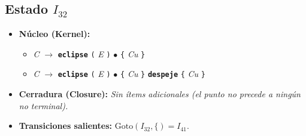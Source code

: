 \documentclass[12pt, letterpaper]{article}
\begin{document}
\subsection*{Estado $I_{32}$ }
\begin{itemize}\setlength{\itemsep}{1pt}\setlength{\parskip}{0pt}
\item \textbf{Núcleo (Kernel):}
\begin{itemize}\setlength{\itemsep}{1pt}\setlength{\parskip}{0pt}
    \item \textit{C} $\to$ \textbf{\texttt{eclipse}} \texttt{(} \textit{E} \texttt{)} $\bullet$ \texttt{\{} \textit{Cu} \texttt{\}}
    \item \textit{C} $\to$ \textbf{\texttt{eclipse}} \texttt{(} \textit{E} \texttt{)} $\bullet$ \texttt{\{} \textit{Cu} \texttt{\}} \textbf{\texttt{despeje}} \texttt{\{} \textit{Cu} \texttt{\}}
\end{itemize}
\item \textbf{Cerradura (Closure):} \emph{Sin ítems adicionales (el punto no precede a ningún no terminal).}
\item \textbf{Transiciones salientes:} $\text{Goto}(I_{32}, \texttt{\{}) = I_{41}$.
\end{itemize}
\vspace{2pt}
\end{document}
